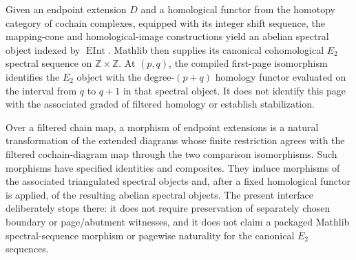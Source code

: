 \begin{definition}
  \label{def:filtered-complex-endpoint-e2-spectral-sequence}
  \leanok
  Given an endpoint extension $D$ and a homological functor from the homotopy
  category of cochain complexes, equipped with its integer shift sequence,
  the mapping-cone and homological-image constructions yield an abelian
  spectral object indexed by $\operatorname{EInt}$.  Mathlib then supplies
  its canonical cohomological $E_2$ spectral sequence on
  $\mathbb Z\times\mathbb Z$.  At $(p,q)$, the compiled first-page
  isomorphism identifies the $E_2$ object with the degree-$(p+q)$ homology
  functor evaluated on the interval from $q$ to $q+1$ in that spectral object.
  It does not identify this page with the associated graded of filtered
  homology or establish stabilization.
\end{definition}

\begin{definition}
  \label{def:filtered-complex-endpoint-extension-morphism}
  \leanok
  Over a filtered chain map, a morphism of endpoint extensions is a natural
  transformation of the extended diagrams whose finite restriction agrees
  with the filtered cochain-diagram map through the two comparison
  isomorphisms.  Such morphisms have specified identities and composites.
  They induce morphisms of the associated triangulated spectral objects and,
  after a fixed homological functor is applied, of the resulting abelian
  spectral objects.  The present interface deliberately stops there: it does
  not require preservation of separately chosen boundary or page/abutment
  witnesses, and it does not claim a packaged Mathlib spectral-sequence
  morphism or pagewise naturality for the canonical $E_2$ sequences.
\end{definition}

